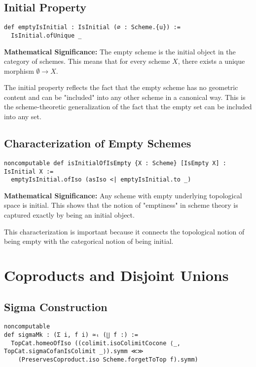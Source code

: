\documentclass{article}
\theoremstyle{definition}
\begin{document}
\subsection{Initial Property}

\begin{lstlisting}
def emptyIsInitial : IsInitial (∅ : Scheme.{u}) :=
  IsInitial.ofUnique _
\end{lstlisting}

\textbf{Mathematical Significance:} The empty scheme is the initial object in the category of schemes. This means that for every scheme $X$, there exists a unique morphism $\emptyset \to X$.

The initial property reflects the fact that the empty scheme has no geometric content and can be "included" into any other scheme in a canonical way. This is the scheme-theoretic generalization of the fact that the empty set can be included into any set.

\subsection{Characterization of Empty Schemes}

\begin{lstlisting}
noncomputable def isInitialOfIsEmpty {X : Scheme} [IsEmpty X] : IsInitial X :=
  emptyIsInitial.ofIso (asIso <| emptyIsInitial.to _)
\end{lstlisting}

\textbf{Mathematical Significance:} Any scheme with empty underlying topological space is initial. This shows that the notion of "emptiness" in scheme theory is captured exactly by being an initial object.

This characterization is important because it connects the topological notion of being empty with the categorical notion of being initial.

\section{Coproducts and Disjoint Unions}

\subsection{Sigma Construction}

\begin{lstlisting}
noncomputable
def sigmaMk : (Σ i, f i) ≃ₜ (∐ f :) :=
  TopCat.homeoOfIso ((colimit.isoColimitCocone ⟨_, TopCat.sigmaCofanIsColimit _⟩).symm ≪≫
    (PreservesCoproduct.iso Scheme.forgetToTop f).symm)
\end{lstlisting}
\end{document}
